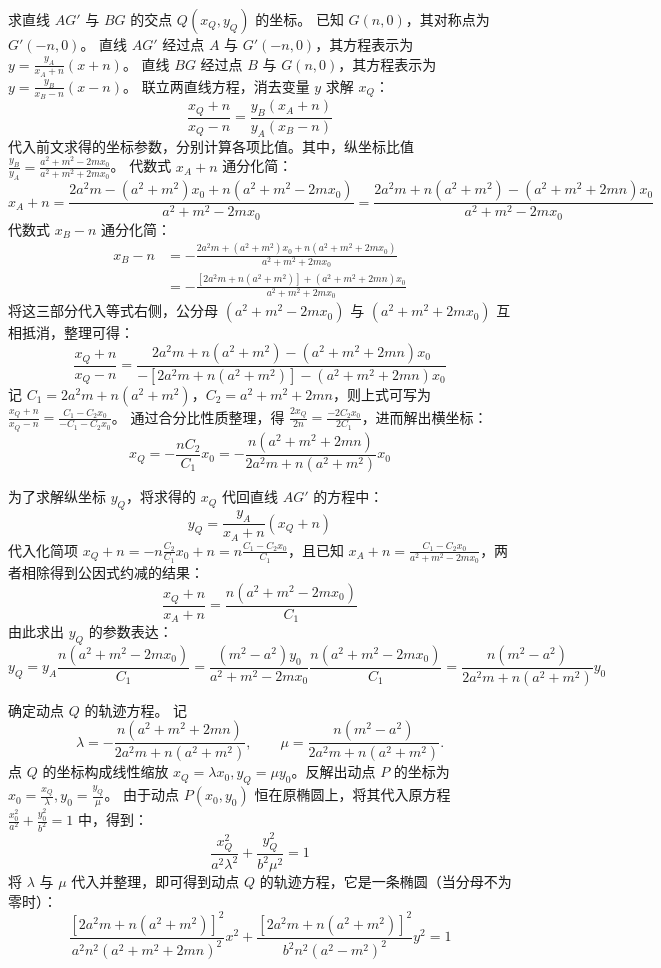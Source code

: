\begin{solution}
求直线 $AG'$ 与 $BG$ 的交点 $Q(x_Q, y_Q)$ 的坐标。
已知 $G(n,0)$，其对称点为 $G'(-n,0)$。
直线 $AG'$ 经过点 $A$ 与 $G'(-n,0)$，其方程表示为 $y = \frac{y_A}{x_A+n}(x+n)$。
直线 $BG$ 经过点 $B$ 与 $G(n,0)$，其方程表示为 $y = \frac{y_B}{x_B-n}(x-n)$。
联立两直线方程，消去变量 $y$ 求解 $x_Q$：
$$ \frac{x_Q+n}{x_Q-n} = \frac{y_B(x_A+n)}{y_A(x_B-n)} $$
代入前文求得的坐标参数，分别计算各项比值。其中，纵坐标比值 $\frac{y_B}{y_A} = \frac{a^2+m^2-2mx_0}{a^2+m^2+2mx_0}$。
代数式 $x_A+n$ 通分化简：
$$ x_A+n = \frac{2a^2 m - (a^2+m^2)x_0 + n(a^2+m^2-2mx_0)}{a^2+m^2-2mx_0} = \frac{2a^2 m + n(a^2+m^2) - (a^2+m^2+2mn)x_0}{a^2+m^2-2mx_0} $$
代数式 $x_B-n$ 通分化简：
\[
\begin{aligned}
x_B-n
&= -\frac{2a^2 m+ (a^2+m^2)x_0 + n(a^2+m^2+2mx_0)}{a^2+m^2+2mx_0} \\
&= - \frac{[2a^2 m + n(a^2+m^2)] + (a^2+m^2+2mn)x_0}{a^2+m^2+2mx_0}
\end{aligned}
\]
将这三部分代入等式右侧，公分母 $(a^2+m^2-2mx_0)$ 与 $(a^2+m^2+2mx_0)$ 互相抵消，整理可得：
$$ \frac{x_Q+n}{x_Q-n} = \frac{2a^2 m + n(a^2+m^2) - (a^2+m^2+2mn)x_0}{- [2a^2 m + n(a^2+m^2)] - (a^2+m^2+2mn)x_0} $$
记 $C_1 = 2a^2 m + n(a^2+m^2)$，$C_2 = a^2+m^2+2mn$，则上式可写为 $\frac{x_Q+n}{x_Q-n} = \frac{C_1 - C_2 x_0}{-C_1 - C_2 x_0}$。
通过合分比性质整理，得 $\frac{2x_Q}{2n} = \frac{-2C_2 x_0}{2C_1}$，进而解出横坐标：
$$ x_Q = -\frac{n C_2}{C_1} x_0 = -\frac{n(a^2+m^2+2mn)}{2a^2 m + n(a^2+m^2)} x_0 $$

为了求解纵坐标 $y_Q$，将求得的 $x_Q$ 代回直线 $AG'$ 的方程中：
$$ y_Q = \frac{y_A}{x_A+n}(x_Q+n) $$
代入化简项 $x_Q+n = -n\frac{C_2}{C_1}x_0 + n = n\frac{C_1 - C_2 x_0}{C_1}$，且已知 $x_A+n = \frac{C_1 - C_2 x_0}{a^2+m^2-2mx_0}$，两者相除得到公因式约减的结果：
$$ \frac{x_Q+n}{x_A+n} = \frac{n(a^2+m^2-2mx_0)}{C_1} $$
由此求出 $y_Q$ 的参数表达：
$$ y_Q = y_A \frac{n(a^2+m^2-2mx_0)}{C_1} = \frac{(m^2-a^2)y_0}{a^2+m^2-2mx_0} \frac{n(a^2+m^2-2mx_0)}{C_1} = \frac{n(m^2-a^2)}{2a^2 m + n(a^2+m^2)} y_0 $$

确定动点 $Q$ 的轨迹方程。
记
$$ \lambda = -\frac{n(a^2+m^2+2mn)}{2a^2 m + n(a^2+m^2)}, \qquad \mu = \frac{n(m^2-a^2)}{2a^2 m + n(a^2+m^2)}. $$
点 $Q$ 的坐标构成线性缩放 $x_Q = \lambda x_0, y_Q = \mu y_0$。反解出动点 $P$ 的坐标为 $x_0 = \frac{x_Q}{\lambda}, y_0 = \frac{y_Q}{\mu}$。
由于动点 $P(x_0, y_0)$ 恒在原椭圆上，将其代入原方程 $\frac{x_0^2}{a^2} + \frac{y_0^2}{b^2} = 1$ 中，得到：
$$ \frac{x_Q^2}{a^2 \lambda^2} + \frac{y_Q^2}{b^2 \mu^2} = 1 $$
将 $\lambda$ 与 $\mu$ 代入并整理，即可得到动点 $Q$ 的轨迹方程，它是一条椭圆（当分母不为零时）：
$$ \frac{[2a^2 m + n(a^2+m^2)]^2}{a^2 n^2 (a^2+m^2+2mn)^2} x^2 + \frac{[2a^2 m + n(a^2+m^2)]^2}{b^2 n^2 (a^2-m^2)^2} y^2 = 1 $$
\end{solution}

